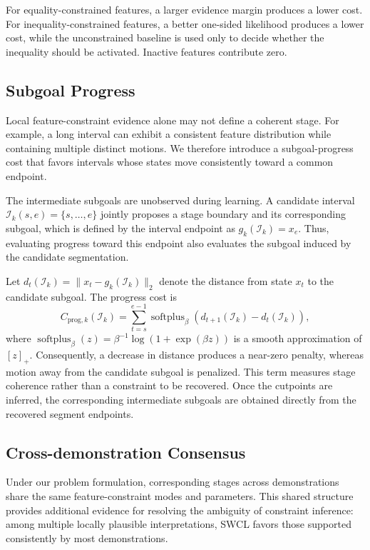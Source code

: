 \documentclass[lettersize,journal]{IEEEtran}
\begin{document}
For equality-constrained features, a larger evidence margin produces a lower cost. For inequality-constrained features, a better one-sided likelihood produces a lower cost, while the unconstrained baseline is used only to decide whether the inequality should be activated. Inactive features contribute zero. 


\subsection{Subgoal Progress}
\label{sec:subgoal_progress}

Local feature-constraint evidence alone may not define a coherent stage. For example, a long interval can exhibit a consistent feature distribution while containing multiple distinct motions. We therefore introduce a subgoal-progress cost that favors intervals whose states move consistently toward a common endpoint.

The intermediate subgoals are unobserved during learning. A candidate interval $\mathcal{I}_k(s,e)=\{s,\dots,e\}$ jointly proposes a stage boundary and its corresponding subgoal, which is defined by the interval endpoint as $g_k(\mathcal{I}_k)=x_e$. Thus, evaluating progress toward this endpoint also evaluates the subgoal induced by the candidate segmentation.

Let $d_t(\mathcal{I}_k)=\|x_t-g_k(\mathcal{I}_k)\|_2$ denote the distance from state $x_t$ to the candidate subgoal. The progress cost is
\begin{equation}
C_{\mathrm{prog},k}(\mathcal{I}_k)
=
\sum_{t=s}^{e-1}
\operatorname{softplus}_{\beta}
\left(
d_{t+1}(\mathcal{I}_k)
-
d_t(\mathcal{I}_k)
\right),
\label{eq:progress_cost}
\end{equation}
where $\operatorname{softplus}_{\beta}(z)=\beta^{-1}\log(1+\exp(\beta z))$ is a smooth approximation of $[z]_+$. Consequently, a decrease in distance produces a near-zero penalty, whereas motion away from the candidate subgoal is penalized. This term measures stage coherence rather than a constraint to be recovered. Once the cutpoints are inferred, the corresponding intermediate subgoals are obtained directly from the recovered segment endpoints.


\subsection{Cross-demonstration Consensus}
\label{sec:consensus_terms}

Under our problem formulation, corresponding stages across demonstrations share the same feature-constraint modes and parameters. This shared structure provides additional evidence for resolving the ambiguity of constraint inference: among multiple locally plausible interpretations, SWCL favors those supported consistently by most demonstrations.  
\end{document}

